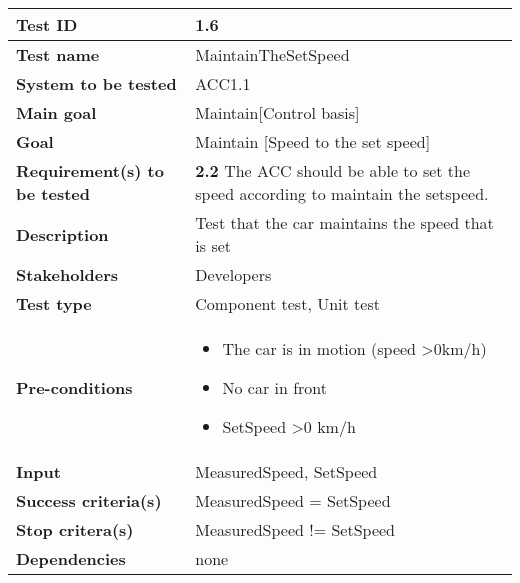 	\begin{table}[H]
		\begin{tabular}{| p{4cm} | p{10cm} |}
		\hline
		\rowcolor{gray}
			\hline
			{\bf Test ID} & 1.6 \\ \hline
			{\bf Test name} & MaintainTheSetSpeed \\ \hline
			{\bf System to be tested} & ACC1.1\\ \hline
			{\bf Main goal} & Maintain[Control basis] \\ \hline
			{\bf Goal} & Maintain [Speed to the set speed] \\ \hline
			{\bf Requirement(s) to be tested} & {\bf 2.2} The ACC should be able to 
			set the speed according to maintain the setspeed.\\ \hline
			{\bf Description} & Test that the car maintains the speed that is set \\ \hline
			{\bf Stakeholders} & Developers\\ \hline
			{\bf Test type} & Component test, Unit test \\ \hline
			{\bf Pre-conditions} & 
				\begin{itemize}
					\item The car is in motion (speed \textgreater 0km/h)
					\item No car in front 
					\item SetSpeed \textgreater 0 km/h
				\end{itemize} \\ \hline
			{\bf Input} & MeasuredSpeed, SetSpeed \\ \hline
			{\bf Success criteria(s)}& MeasuredSpeed = SetSpeed \\ \hline
			{\bf Stop critera(s)} &  MeasuredSpeed != SetSpeed \\ \hline
			{\bf Dependencies} & none\\ \hline
		\end{tabular}
	\end{table}

